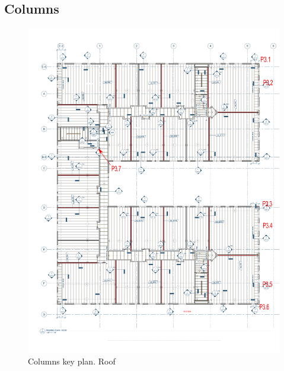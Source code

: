 \subsection{Columns}

\begin{figure}
  \begin{center}
  \includegraphics[width=120mm]{figures/columns/columns_key_plan_roof}
  \end{center}
  \caption{Columns key plan. Roof}\label{fg_columns_key_plan_roof}
\end{figure}

